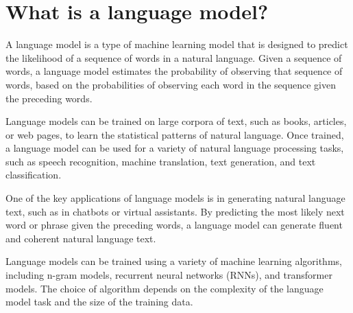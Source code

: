 \section{What is a language model?}
A language model is a type of machine learning model that is designed to predict the likelihood of a sequence of words in a natural language. Given a sequence of words, a language model estimates the probability of observing that sequence of words, based on the probabilities of observing each word in the sequence given the preceding words.

Language models can be trained on large corpora of text, such as books, articles, or web pages, to learn the statistical patterns of natural language. Once trained, a language model can be used for a variety of natural language processing tasks, such as speech recognition, machine translation, text generation, and text classification.

One of the key applications of language models is in generating natural language text, such as in chatbots or virtual assistants. By predicting the most likely next word or phrase given the preceding words, a language model can generate fluent and coherent natural language text.

Language models can be trained using a variety of machine learning algorithms, including n-gram models, recurrent neural networks (RNNs), and transformer models. The choice of algorithm depends on the complexity of the language model task and the size of the training data.

